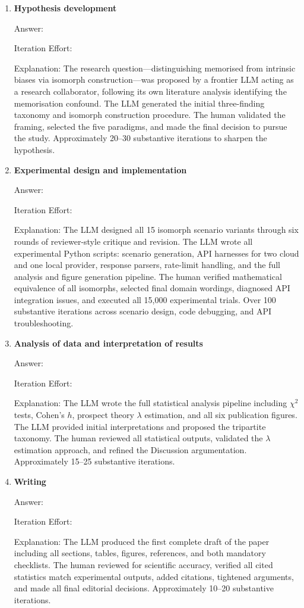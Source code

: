 \documentclass{article}
\begin{document}
\begin{enumerate}

\item \textbf{Hypothesis development}

Answer: \involvementC{}

Iteration Effort: \iterationMedium{}

Explanation: The research question---distinguishing memorised from intrinsic biases via isomorph
construction---was proposed by a frontier LLM acting as a research collaborator, following its own
literature analysis identifying the memorisation confound. The LLM generated the initial three-finding
taxonomy and isomorph construction procedure. The human validated the framing, selected the
five paradigms, and made the final decision to pursue the study. Approximately 20--30 substantive
iterations to sharpen the hypothesis.

\item \textbf{Experimental design and implementation}

Answer: \involvementC{}

Iteration Effort: \iterationHigh{}

Explanation: The LLM designed all 15 isomorph scenario variants through six rounds of reviewer-style
critique and revision. The LLM wrote all experimental Python scripts: scenario generation, API
harnesses for two cloud and one local provider, response parsers, rate-limit handling, and the full
analysis and figure generation pipeline. The human verified mathematical equivalence of all isomorphs,
selected final domain wordings, diagnosed API integration issues, and executed all 15,000 experimental
trials. Over 100 substantive iterations across scenario design, code debugging, and API troubleshooting.

\item \textbf{Analysis of data and interpretation of results}

Answer: \involvementC{}

Iteration Effort: \iterationMedium{}

Explanation: The LLM wrote the full statistical analysis pipeline including $\chi^2$ tests, Cohen's $h$,
prospect theory $\lambda$ estimation, and all six publication figures. The LLM provided initial
interpretations and proposed the tripartite taxonomy. The human reviewed all statistical outputs,
validated the $\lambda$ estimation approach, and refined the Discussion argumentation. Approximately
15--25 substantive iterations.

\item \textbf{Writing}

Answer: \involvementC{}

Iteration Effort: \iterationMedium{}

Explanation: The LLM produced the first complete draft of the paper including all sections, tables,
figures, references, and both mandatory checklists. The human reviewed for scientific accuracy,
verified all cited statistics match experimental outputs, added citations, tightened arguments, and made
all final editorial decisions. Approximately 10--20 substantive iterations.

\end{enumerate}
\end{document}
